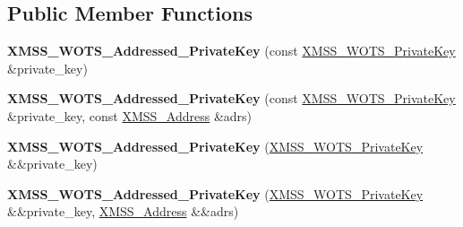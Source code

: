 \subsection*{Public Member Functions}
\begin{DoxyCompactItemize}
\item 
\mbox{\label{class_botan_1_1_x_m_s_s___w_o_t_s___addressed___private_key_a1089ef102580abb1efef9763e9305902}} 
{\bfseries X\+M\+S\+S\+\_\+\+W\+O\+T\+S\+\_\+\+Addressed\+\_\+\+Private\+Key} (const \mbox{\hyperlink{class_botan_1_1_x_m_s_s___w_o_t_s___private_key}{X\+M\+S\+S\+\_\+\+W\+O\+T\+S\+\_\+\+Private\+Key}} \&private\+\_\+key)
\item 
\mbox{\label{class_botan_1_1_x_m_s_s___w_o_t_s___addressed___private_key_aa67a787d2fb0387e94d8cbba8acd4029}} 
{\bfseries X\+M\+S\+S\+\_\+\+W\+O\+T\+S\+\_\+\+Addressed\+\_\+\+Private\+Key} (const \mbox{\hyperlink{class_botan_1_1_x_m_s_s___w_o_t_s___private_key}{X\+M\+S\+S\+\_\+\+W\+O\+T\+S\+\_\+\+Private\+Key}} \&private\+\_\+key, const \mbox{\hyperlink{class_botan_1_1_x_m_s_s___address}{X\+M\+S\+S\+\_\+\+Address}} \&adrs)
\item 
\mbox{\label{class_botan_1_1_x_m_s_s___w_o_t_s___addressed___private_key_af3edf7ba8dc3f4871a315d63c927f9f9}} 
{\bfseries X\+M\+S\+S\+\_\+\+W\+O\+T\+S\+\_\+\+Addressed\+\_\+\+Private\+Key} (\mbox{\hyperlink{class_botan_1_1_x_m_s_s___w_o_t_s___private_key}{X\+M\+S\+S\+\_\+\+W\+O\+T\+S\+\_\+\+Private\+Key}} \&\&private\+\_\+key)
\item 
\mbox{\label{class_botan_1_1_x_m_s_s___w_o_t_s___addressed___private_key_a24a34dfb72b8b483eebb0d01ff0cb636}} 
{\bfseries X\+M\+S\+S\+\_\+\+W\+O\+T\+S\+\_\+\+Addressed\+\_\+\+Private\+Key} (\mbox{\hyperlink{class_botan_1_1_x_m_s_s___w_o_t_s___private_key}{X\+M\+S\+S\+\_\+\+W\+O\+T\+S\+\_\+\+Private\+Key}} \&\&private\+\_\+key, \mbox{\hyperlink{class_botan_1_1_x_m_s_s___address}{X\+M\+S\+S\+\_\+\+Address}} \&\&adrs)
\item 
\mbox{\label{class_botan_1_1_x_m_s_s___w_o_t_s___addressed___private_key_a74995a12dc78c69ff77344cbb2902e59}} 

\end{DoxyCompactItemize}
